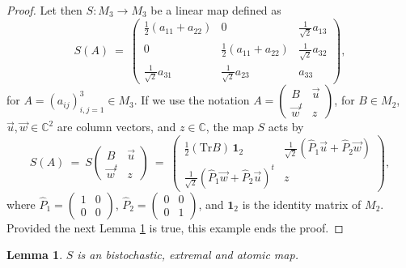 \documentclass[12pt]{article}
\theoremstyle{plain}
\newtheorem{lemma}{Lemma}
\theoremstyle{definition}
\theoremstyle{remark}
\numberwithin{equation}{section}
\begin{document}
\begin{proof}
Let then $S\!: M_{3} \rightarrow M_{3}$ be a linear map defined as
\begin{equation}
\label{eq:DefinitionOfS}
S(A) \:=\: \begin{pmatrix}
        \frac{1}{2}(a_{11} + a_{22}) & 0 & \frac{1}{\sqrt{2}} a_{13} \\
        0 & \frac{1}{2}(a_{11} + a_{22}) & \frac{1}{\sqrt{2}} a_{32} \\
        \frac{1}{\sqrt{2}} a_{31} & \frac{1}{\sqrt{2}} a_{23} & a_{33}
        \end{pmatrix},
\end{equation}
for
$A = \left( a_{ij} \right)_{i,j=1}^{3}
        \in M_{3}$.
If we use the notation
$A = \left( \begin{smallmatrix}
    B & \vec{u} \\
    \vec{w}^{t} & z
    \end{smallmatrix} \right)$,
for $B \in M_{2}$,
$\vec{u},\vec{w} \in \mathbb{C}^{2}$ are column vectors,
and $z \in \mathbb{C}$,
the map $S$ acts by
\begin{equation}
    S(A) \:=\: S \begin{pmatrix}
    B & \vec{u} \\
    \vec{w}^{t} & z
    \end{pmatrix} \: = \:
    \begin{pmatrix}
        \frac{1}{2} (\text{Tr} B) \, \mathbf{1}_{2} &
            \frac{1}{\sqrt{2}}(\hat{P}_{1} \vec{u} + \hat{P}_{2} \vec{w}) \\
        \frac{1}{\sqrt{2}}(\hat{P}_{1} \vec{w} + \hat{P}_{2} \vec{u})^{t} & z
    \end{pmatrix},
\end{equation}
where
$\hat{P}_{1} = \left( \begin{smallmatrix} 1 & 0 \\ 0 & 0 \end{smallmatrix} \right)$,
$\hat{P}_{2} = \left( \begin{smallmatrix} 0 & 0 \\ 0 & 1 \end{smallmatrix} \right)$,
and $\mathbf{1}_{2}$ is the identity matrix of $M_{2}$.
Provided the next Lemma \ref{lem:SIsExtremal} is true, 
this example ends the proof.
\end{proof}


\begin{lemma}
\label{lem:SIsExtremal}
$S$ is an bistochastic, extremal and atomic map.
\end{lemma}
\end{document}
